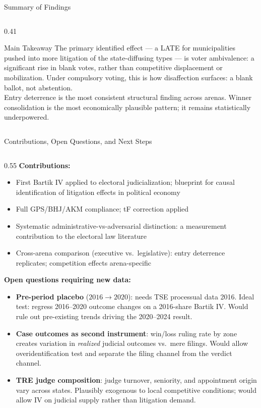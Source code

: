 \documentclass[aspectratio=169,10pt]{beamer}
\begin{document}
\begin{frame}{Summary of Findings}
\begin{columns}[T]
\begin{column}{0.41\textwidth}
\begin{alertblock}{Main Takeaway}
  The primary identified effect --- a LATE for municipalities pushed into more litigation of the state-diffusing types --- is voter ambivalence: a significant rise in blank votes, rather than competitive displacement or mobilization. Under compulsory voting, this is how disaffection surfaces: a blank ballot, not abstention.
  \medskip\\
  Entry deterrence is the most consistent structural finding across arenas. Winner consolidation is the most economically plausible pattern; it remains statistically underpowered.
\end{alertblock}
\end{column}
\end{columns}
\end{frame}


\begin{frame}{Contributions, Open Questions, and Next Steps}
\begin{columns}[T]
\begin{column}{0.55\textwidth}
\textbf{Contributions:}
\begin{itemize}
  \item First Bartik IV applied to electoral judicialization; blueprint for causal identification of litigation effects in political economy
  \item Full GPS/BHJ/AKM compliance; tF correction applied
  \item Systematic administrative-vs-adversarial distinction: a measurement contribution to the electoral law literature
  \item Cross-arena comparison (executive vs.\ legislative): entry deterrence replicates; competition effects arena-specific
\end{itemize}
\medskip
\textbf{Open questions requiring new data:}
\begin{itemize}
  \item \textbf{Pre-period placebo} ($2016\to2020$): needs TSE processual data 2016. Ideal test: regress 2016--2020 outcome changes on a 2016-share Bartik IV. Would rule out pre-existing trends driving the 2020--2024 result.
  \item \textbf{Case outcomes as second instrument}: win/loss ruling rate by zone creates variation in \emph{realized} judicial outcomes vs.\ mere filings. Would allow overidentification test and separate the filing channel from the verdict channel.
  \item \textbf{TRE judge composition}: judge turnover, seniority, and appointment origin vary across states. Plausibly exogenous to local competitive conditions; would allow IV on judicial supply rather than litigation demand.

\end{itemize}
\end{column}
\end{columns}
\end{frame}
\end{document}
